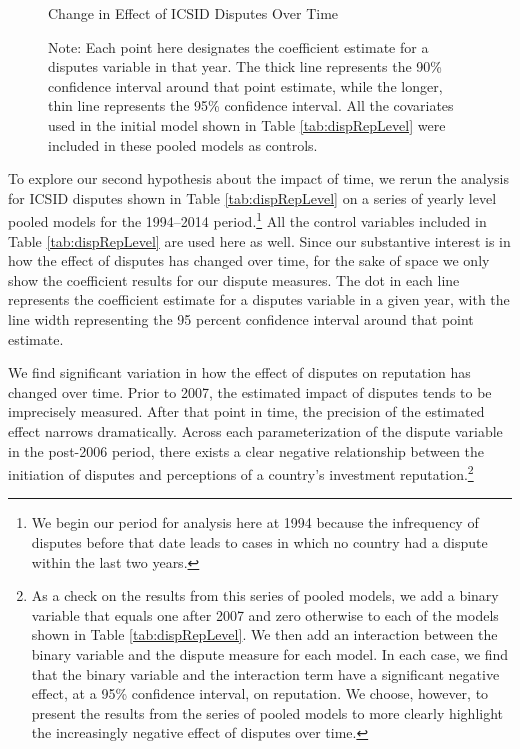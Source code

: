 \documentclass[12pt,onesided]{amsart}
\begin{document}
\begin{figure}[ht]
	\centering
	\caption{Change in Effect of ICSID Disputes Over Time}
	\label{fig:dispEffectYear}
	\resizebox{1\textwidth}{!}{}
	\caption*{Note: Each point here designates the coefficient estimate for a disputes variable in that year. The thick line represents the 90\% confidence interval around that point estimate, while the longer, thin line represents the 95\% confidence interval. All the covariates used in the initial model shown in Table \ref{tab:dispRepLevel} were included in these pooled models as controls.}
\end{figure}
\FloatBarrier

To explore our second hypothesis about the impact of time, we rerun the analysis for ICSID disputes shown in Table \ref{tab:dispRepLevel} on a series of yearly level pooled models for the 1994--2014 period.\footnote{We begin our period for analysis here at 1994 because the infrequency of disputes before that date leads to cases in which no country had a dispute within the last two years.} All the control variables included in Table \ref{tab:dispRepLevel} are used here as well. Since our substantive interest is in how the effect of disputes has changed over time, for the sake of space we only show the coefficient results for our dispute measures. The dot in each line represents the coefficient estimate for a disputes variable in a given year, with the line width representing the 95 percent confidence interval around that point estimate. 

We find significant variation in how the effect of disputes on reputation has changed over time. Prior to 2007, the estimated impact of disputes tends to be imprecisely measured. After that point in time, the precision of the estimated effect narrows dramatically. Across each parameterization of the dispute variable in the post-2006 period, there exists a clear negative relationship between the initiation of disputes and perceptions of a country's investment reputation.\footnote{As a check on the results from this series of pooled models, we add a binary variable that equals one after 2007 and zero otherwise to each of the models shown in Table \ref{tab:dispRepLevel}. We then add an interaction between the binary variable and the dispute measure for each model. In each case, we find that the binary variable and the interaction term have a significant negative effect, at a 95\% confidence interval, on reputation. We choose, however, to present the results from the series of pooled models to more clearly highlight the increasingly negative effect of disputes over time.} 
\end{document}
